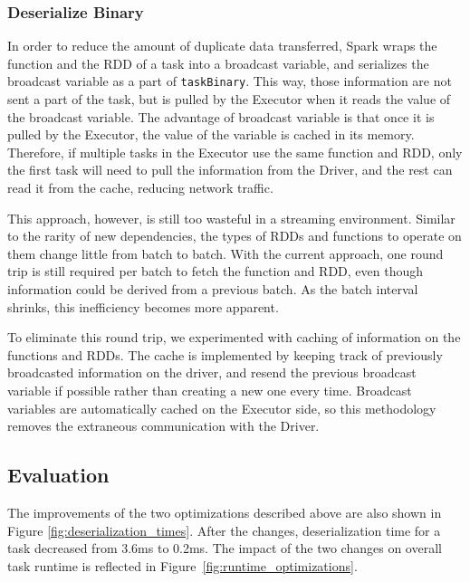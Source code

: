 \subsubsection{Deserialize Binary}
In order to reduce the amount of duplicate data transferred, Spark wraps the function and the RDD of a task into a broadcast variable, and serializes the broadcast variable as a part of \texttt{taskBinary}. This way, those information are not sent a part of the task, but is pulled by the Executor when it reads the value of the broadcast variable. The advantage of broadcast variable is that once it is pulled by the Executor, the value of the variable is cached in its memory. Therefore, if multiple tasks in the Executor use the same function and RDD, only the first task will need to pull the information from the Driver, and the rest can read it from the cache, reducing network traffic.

This approach, however, is still too wasteful in a streaming environment. Similar to the rarity of new dependencies, the types of RDDs and functions to operate on them change little from batch to batch. With the current approach, one round trip is still required per batch to fetch the function and RDD, even though information could be derived from a previous batch. As the batch interval shrinks, this inefficiency becomes more apparent.

To eliminate this round trip, we experimented with caching of information on the functions and RDDs. The cache is implemented by keeping track of previously broadcasted information on the driver, and resend the previous broadcast variable if possible rather than creating a new one every time. Broadcast variables are automatically cached on the Executor side, so this methodology removes the extraneous communication with the Driver.

\subsection{Evaluation}
The improvements of the two optimizations described above are also shown in Figure \ref{fig:deserialization_times}. After the changes, deserialization time for a task decreased from 3.6ms to 0.2ms. The impact of the two changes on overall task runtime is reflected in Figure~\ref{fig:runtime_optimizations}.

